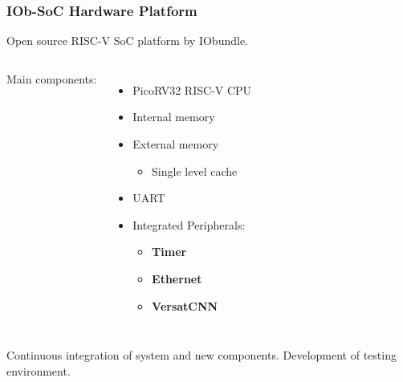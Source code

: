 


\begin{frame}
  \frametitle{IOb-SoC Hardware Platform}
  Open source RISC-V SoC platform by IObundle.  
\vspace{0.5cm}
  \begin{columns}
  Main components:
  \begin{itemize}
    \item PicoRV32 RISC-V CPU
    \item Internal memory
    \item External memory
      \begin{itemize}
      \item Single level cache
      \end{itemize}
    \item UART
    \item Integrated Peripherals:
      \begin{itemize}
      \item \textbf{Timer}
      \item \textbf{Ethernet}
      \item \textbf{VersatCNN}
      \end{itemize}  
  \end{itemize}
\end{columns}
\vspace{1cm}
  \begin{block}{}
  Continuous integration of system and new components.\newline
  Development of testing environment.
  \end{block}
\end{frame}





